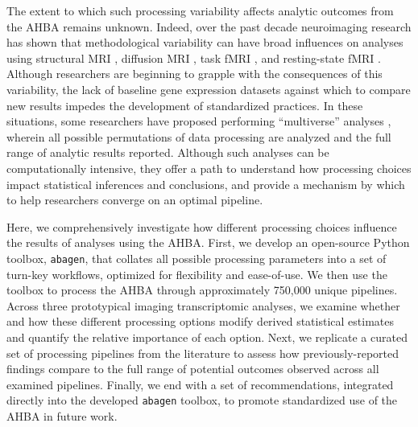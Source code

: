 \documentclass[12pt,aps,pra,reprint,showkeys]{revtex4-1}
\begin{document}
The extent to which such processing variability affects analytic outcomes from the AHBA remains unknown.
Indeed, over the past decade neuroimaging research has shown that methodological variability can have broad influences on analyses using structural MRI \citep{bhagwat2021gigascience, kharabian2020cercor}, diffusion MRI \citep{oldham2020neuroimage, maier2017natcomm, schilling2019neuroimage}, task fMRI \citep{carp2012frontneurosci, botviniknesser2020nature}, and resting-state fMRI \citep{parkes2018neuroimage, ciric2017neuroimage}.
Although researchers are beginning to grapple with the consequences of this variability, the lack of baseline gene expression datasets against which to compare new results impedes the development of standardized practices.
In these situations, some researchers have proposed performing ``multiverse'' analyses \citep{steegen2016psp, dragicevic2019chi}, wherein all possible permutations of data processing are analyzed and the full range of analytic results reported.
Although such analyses can be computationally intensive, they offer a path to understand how processing choices impact statistical inferences and conclusions, and provide a mechanism by which to help researchers converge on an optimal pipeline.

Here, we comprehensively investigate how different processing choices influence the results of analyses using the AHBA.
First, we develop an open-source Python toolbox, \texttt{abagen}, that collates all possible processing parameters into a set of turn-key workflows, optimized for flexibility and ease-of-use.
We then use the toolbox to process the AHBA through approximately 750,000 unique pipelines.
Across three prototypical imaging transcriptomic analyses, we examine whether and how these different processing options modify derived statistical estimates and quantify the relative importance of each option.
Next, we replicate a curated set of processing pipelines from the literature to assess how previously-reported findings compare to the full range of potential outcomes observed across all examined pipelines.
Finally, we end with a set of recommendations, integrated directly into the developed \texttt{abagen} toolbox, to promote standardized use of the AHBA in future work.
\end{document}
